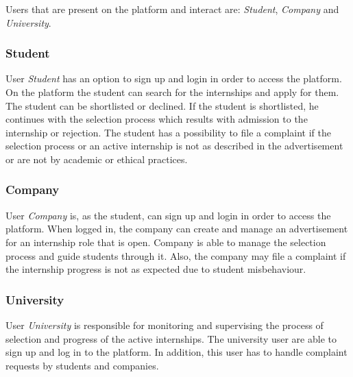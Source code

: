 Users that are present on the platform and interact are: \textit{Student}, \textit{Company} and \textit{University}.

\subsubsection{Student}
User \textit{Student} has an option to sign up and login in order to access the platform. On the platform the student can search for the internships and apply for them. The student can be shortlisted or declined. If the student is shortlisted, he continues with the selection process which results with admission to the internship or rejection. The student has a possibility to file a complaint if the selection process or an active internship is not as described in the advertisement or are not by academic or ethical practices.


\subsubsection{Company}

User \textit{Company} is, as the student, can sign up and login in order to access the platform. When logged in, the company can create and manage an advertisement for an internship role that is open. Company is able to manage the selection process and guide students through it. Also, the company may file a complaint if the internship progress is not as expected due to student misbehaviour. 



\subsubsection{University}
User \textit{University} is responsible for monitoring and supervising the process of selection and progress of the active internships. The university user are able to sign up and log in to the platform. In addition, this user has to handle complaint requests by students and companies. 

